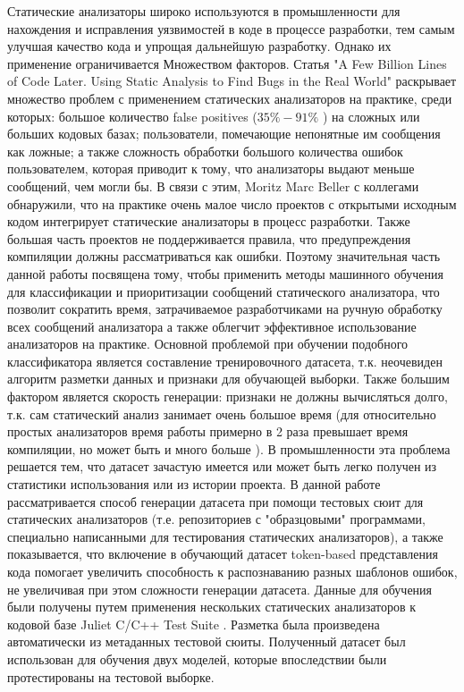 Статические анализаторы широко используются в промышленности для нахождения и исправления уязвимостей в коде в процессе разработки, тем самым улучшая качество кода и упрощая дальнейшую разработку. Однако их применение ограничивается Множеством факторов. Статья "A Few Billion Lines of Code Later. Using Static Analysis to Find Bugs in the Real World"\cite{Bessey2010AFB} раскрывает множество проблем с применением статических анализаторов на практике, среди которых: большое количество false positives ($35\% - 91\%$ \cite{HECKMAN2011363})  на сложных или больших кодовых базах; пользователи, помечающие непонятные им сообщения как ложные; а также сложность обработки большого количества ошибок пользователем, которая приводит к тому, что анализаторы выдают меньше сообщений, чем могли бы. В связи с этим, Moritz Marc Beller с коллегами \cite{Beller2016AnalyzingTS} обнаружили, что на практике очень малое число проектов с открытыми исходным кодом интегрирует статические анализаторы в процесс разработки. Также большая часть проектов не поддерживается правила, что предупреждения компиляции должны рассматриваться как ошибки.  Поэтому значительная часть данной работы посвящена тому, чтобы применить методы машинного обучения для классификации и приоритизации сообщений статического анализатора, что позволит сократить время, затрачиваемое разработчиками на ручную обработку всех сообщений анализатора а также облегчит эффективное использование анализаторов на практике. Основной проблемой при обучении подобного классификатора является составление тренировочного датасета, т.к. неочевиден алгоритм разметки данных и признаки для обучающей выборки. Также большим фактором является скорость генерации: признаки не должны вычисляться долго, т.к. сам статический анализ занимает очень большое время (для относительно простых анализаторов время работы примерно в 2 раза превышает время компиляции, но может быть и много больше \cite{GCC-SA}). В промышленности эта проблема решается тем, что датасет зачастую имеется\cite{Ruthruff2018PredictingAA} \cite{classification-models-multiple-SA-tools} или может быть легко получен из статистики использования или из истории проекта\cite{assesing-validity-of-sa-warnings-cisco}. В данной работе рассматривается способ генерации датасета при помощи тестовых сюит для статических анализаторов\cite{test-suites-for-dataset} (т.е. репозиториев с "образцовыми" программами, специально написанными для тестирования статических анализаторов), а также показывается, что включение в обучающий датасет token-based представления кода помогает увеличить способность к распознаванию разных шаблонов ошибок, не увеличивая при этом сложности генерации датасета. Данные для обучения были получены путем применения нескольких статических анализаторов к кодовой базе Juliet C/C++ Test Suite \cite{Juliet}. Разметка была произведена автоматически из метаданных тестовой сюиты. Полученный датасет был использован для обучения двух моделей, которые впоследствии были протестированы на тестовой выборке.

\newpage